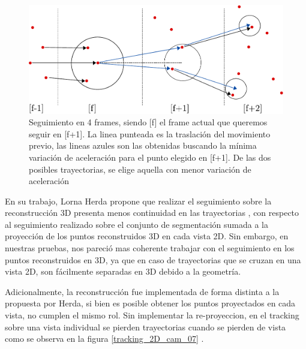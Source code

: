 \begin{figure}[hbt]
\begin{center}
\includegraphics[scale=0.8]{img/Tracking/tracking-eps-converted-to.pdf}
\end{center}
\caption{Seguimiento en 4 frames, siendo [f] el frame actual que queremos seguir en [f+1]. La linea punteada es la traslación del movimiento previo, las lineas azules son las obtenidas buscando la mínima variación de aceleración para el punto elegido en [f+1]. De las dos posibles trayectorias, se elige aquella con menor variación de aceleración}
\label{herda_00}
\end{figure}

En su trabajo\cite{herda}, Lorna Herda propone que realizar el seguimiento sobre la reconstrucción 3D presenta menos continuidad en las trayectorias , con respecto al seguimiento realizado sobre el conjunto de segmentación sumada a la proyección de los puntos reconstruidos 3D en cada vista 2D. Sin embargo, en nuestras pruebas, nos pareció mas coherente trabajar con el seguimiento en los puntos reconstruidos en 3D, ya que en caso de trayectorias que se cruzan en una vista 2D, son fácilmente separadas en 3D debido a la geometría.

Adicionalmente, la reconstrucción fue implementada de forma distinta a la propuesta por Herda, si bien es posible obtener los puntos proyectados en cada vista, no cumplen el mismo rol. Sin implementar la re-proyeccion, en el tracking sobre una vista individual se pierden trayectorias cuando se pierden de vista como se observa en la figura \ref{tracking_2D_cam_07} .

